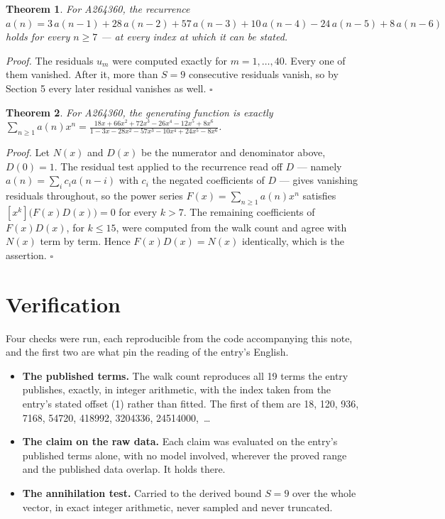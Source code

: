 \documentclass[11pt]{article}
\newtheorem{theorem}{Theorem}
\theoremstyle{definition}
\begin{document}
\begin{theorem} For A264360, the recurrence $a(n) = 3\,a(n-1) + 28\,a(n-2) + 57\,a(n-3) + 10\,a(n-4) - 24\,a(n-5) + 8\,a(n-6)$ holds for every $n \ge 7$ --- at every index at which it can be stated.\end{theorem}

{\itshape Proof.} The residuals $u_m$ were computed exactly for $m = 1,\dots,40$. Every one of them vanished. After it, more than $S = 9$ consecutive residuals vanish, so by Section 5 every later residual vanishes as well. $\square$

\begin{theorem} For A264360, the generating function is exactly $\sum_{n\ge 1} a(n)x^n = \frac{18x + 66x^{2} + 72x^{3} - 26x^{4} - 12x^{5} + 8x^{6}}{1 - 3x - 28x^{2} - 57x^{3} - 10x^{4} + 24x^{5} - 8x^{6}}$.\end{theorem}

{\itshape Proof.} Let $N(x)$ and $D(x)$ be the numerator and denominator above, $D(0)=1$. The residual test applied to the recurrence read off $D$ --- namely $a(n) = \sum_i c_i a(n-i)$ with $c_i$ the negated coefficients of $D$ --- gives vanishing residuals throughout, so the power series $F(x)=\sum_{n\ge 1}a(n)x^n$ satisfies $[x^k]\bigl(F(x)D(x)\bigr) = 0$ for every $k > 7$. The remaining coefficients of $F(x)D(x)$, for $k \le 15$, were computed from the walk count and agree with $N(x)$ term by term. Hence $F(x)D(x) = N(x)$ identically, which is the assertion. $\square$

\section{Verification}

Four checks were run, each reproducible from the code accompanying this note, and the first two are what pin the reading of the entry's English.

\begin{itemize}

\item {\bfseries The published terms.} The walk count reproduces all 19 terms the entry publishes, exactly, in integer arithmetic, with the index taken from the entry's stated offset (1) rather than fitted. The first of them are 18, 120, 936, 7168, 54720, 418992, 3204336, 24514000,~\dots

\item {\bfseries The claim on the raw data.} Each claim was evaluated on the entry's published terms alone, with no model involved, wherever the proved range and the published data overlap. It holds there.

\item {\bfseries The annihilation test.} Carried to the derived bound $S = 9$ over the whole vector, in exact integer arithmetic, never sampled and never truncated.

\end{itemize}
\end{document}
